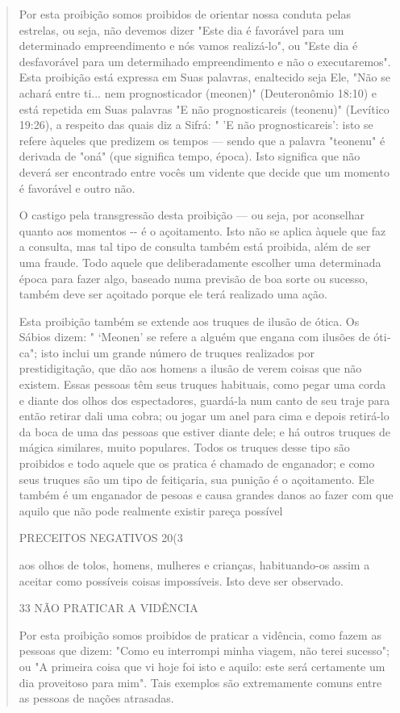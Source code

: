 \begin{quote}
Por esta proibição somos proibidos de orientar nossa conduta pelas
estrelas, ou seja, não devemos dizer "Este dia é favorável para um
determinado empreendimento e nós vamos realizá-lo", ou "Este dia é
desfavorável para um determihado empreendimento e não o executaremos".
Esta proibição está ex­pressa em Suas palavras, enaltecido seja Ele,
"Não se achará entre ti... nem prog­nosticador (meonen)" (Deuteronômio
18:10) e está repetida em Suas palavras "E não prognosticareis
(teonenu)" (Levítico 19:26), a respeito das quais diz a Sifrá: " 'E não
prognosticareis': isto se refere àqueles que predizem os tempos ---
sendo que a palavra "teonenu" é derivada de "oná" (que significa tempo,
época). Isto significa que não deverá ser encontrado entre vocês um
vidente que decide que um momento é favorável e outro não.

O castigo pela transgressão desta proibição --- ou seja, por aconse­lhar
quanto aos momentos -\/- é o açoitamento. Isto não se aplica àquele que
faz a consulta, mas tal tipo de consulta também está proibida, além de
ser uma fraude. Todo aquele que deliberadamente escolher uma determinada
época para fazer algo, baseado numa previsão de boa sorte ou sucesso,
também deve ser açoitado porque ele terá realizado uma ação.

Esta proibição também se extende aos truques de ilusão de ótica. Os
Sábios dizem: " `Meonen' se refere a alguém que engana com ilusões de
óti­ca"; isto inclui um grande número de truques realizados por
prestidigitação, que dão aos homens a ilusão de verem coisas que não
existem. Essas pessoas têm seus truques habituais, como pegar uma corda
e diante dos olhos dos es­pectadores, guardá-la num canto de seu traje
para então retirar dali uma cobra; ou jogar um anel para cima e depois
retirá-lo da boca de uma das pessoas que estiver diante dele; e há
outros truques de mágica similares, muito populares. Todos os truques
desse tipo são proibidos e todo aquele que os pratica é cha­mado de
enganador; e como seus truques são um tipo de feitiçaria, sua punição é
o açoitamento. Ele também é um enganador de pesoas e causa grandes
da­nos ao fazer com que aquilo que não pode realmente existir pareça
possível

PRECEITOS NEGATIVOS 20(3

aos olhos de tolos, homens, mulheres e crianças, habituando-os assim a
aceitar como possíveis coisas impossíveis. Isto deve ser observado.

33 NÃO PRATICAR A VIDÊNCIA

Por esta proibição somos proibidos de praticar a vidência, como fa­zem
as pessoas que dizem: "Como eu interrompi minha viagem, não terei
su­cesso"; ou "A primeira coisa que vi hoje foi isto e aquilo: este será
certamente um dia proveitoso para mim". Tais exemplos são extremamente
comuns entre as pessoas de nações atrasadas.


\end{quote}
